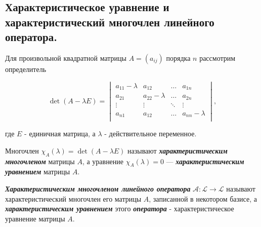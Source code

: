 \subsection{
    Характеристическое уравнение и характеристический многочлен линейного оператора.
}

Для произвольной квадратной матрицы $A = (a_{ij})$ порядка $n$ рассмотрим определитель

$$\det(A - \lambda E) = \begin{vmatrix} 
    a_{11} - \lambda & a_{12} & \ldots & a_{1n} \\
    a_{21} & a_{22} - \lambda & \ldots & a_{2n} \\
    \vdots & \vdots & \ddots & \vdots \ \\
    a_{n1} & a_{12} & \ldots & a_{nn} - \lambda \\
\end{vmatrix},$$

где $E$ - единичная матрица, а $\lambda$ - действительное переменное.

\begin{definition}
    Многочлен $\chi_A(\lambda) = \det(A - \lambda E)$ называют \textbf{\textit{характеристическим многочленом}} матрицы $A$, а уравнение $\chi_A(\lambda) = 0$ — \textbf{\textit{характеристическим уравнением}} матрицы $A$.
\end{definition}

\begin{definition}
    \textbf{\textit{Характеристическим многочленом линейного оператора}} $\mathscr{A} \colon \mathcal{L} \to \mathcal{L}$ называют характеристический многочлен его матрицы $A$, записанной в некотором базисе, а \textbf{\textit{характеристическим уравнением}} этого \textbf{\textit{оператора}} - характеристическое уравнение матрицы $A$.
\end{definition}

